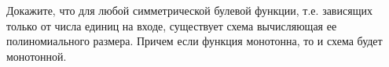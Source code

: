 Докажите, что для любой симметрической булевой функции, т.е. зависящих только от числа единиц на входе,
существует схема вычисляющая ее полиномиального размера. Причем если функция монотонна, то и схема будет
монотонной.